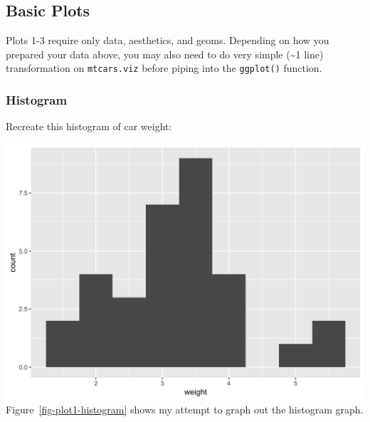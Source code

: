 \documentclass[
  man,
  floatsintext,
  longtable,
  nolmodern,
  notxfonts,
  notimes,
  colorlinks=true,linkcolor=blue,citecolor=blue,urlcolor=blue]{apa7}
\begin{document}
\subsection{Basic Plots}\label{basic-plots}

Plots 1-3 require only data, aesthetics, and geoms. Depending on how you
prepared your data above, you may also need to do very simple
(\textasciitilde1 line) transformation on \texttt{mtcars.viz} before
piping into the \texttt{ggplot()} function.

\subsubsection{Histogram}\label{histogram}

Recreate this histogram of car weight:

\includegraphics{plots/plot1.png} Figure~\ref{fig-plot1-histogram} shows
my attempt to graph out the histogram graph.
\end{document}
